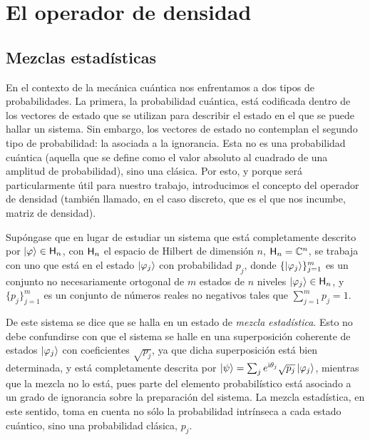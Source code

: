 \section{El operador de densidad}
\label{sec:ch2_density_operator}

\subsection{Mezclas estadísticas}


En el contexto de la mecánica cuántica nos enfrentamos a dos tipos de probabilidades. La primera, la probabilidad cuántica, está codificada dentro de los vectores de estado que se utilizan para describir el estado en el que se puede hallar un sistema. Sin embargo, los vectores de estado no contemplan el segundo tipo de probabilidad: la asociada a la ignorancia. Esta no es una probabilidad cuántica (aquella que se define como el valor absoluto al cuadrado de una amplitud de probabilidad), sino una clásica. Por esto, y porque será particularmente útil para nuestro trabajo, introducimos el concepto del operador de densidad (también llamado, en el caso discreto, que es el que nos incumbe, matriz de densidad).


Supóngase que en lugar de estudiar un sistema que está completamente descrito por $\ket{\varphi}\in{\sf H}_{n}$, con ${\sf H}_{n}$ el espacio de Hilbert de dimensión $n$, \ie{} ${\sf H}_{n}=\mathbb{C}^{n}$, se trabaja con uno que está en el estado $\ket{\varphi_{j}}$ con probabilidad $p_{j}$, donde $\{\ket{\varphi_{j}}\}_{j=1}^{m}$ es un conjunto no necesariamente ortogonal de $m$ estados de $n$ niveles $\ket{\varphi_{j}}\in{\sf H}_{n}$, y $\{p_{j}\}_{j=1}^{m}$ es un conjunto de números reales no negativos tales que $\sum_{j=1}^{m} p_{j}=1$.

De este sistema se dice que se halla en un estado de \textit{mezcla estadística}. Esto no debe confundirse con que el sistema se halle en una superposición coherente de estados $\ket{\varphi_{j}}$ con coeficientes $\sqrt{p_{j}}$, ya que dicha superposición está bien determinada, y está completamente descrita por $\ket{\psi}=\sum_{j} e^{\text{i} \theta_j} \sqrt{p_{j}}\ket{\varphi_{j}}$, mientras que la mezcla no lo está, pues parte del elemento probabilístico está asociado a un grado de ignorancia sobre la preparación del sistema. La mezcla estadística, en este sentido, toma en cuenta no sólo la probabilidad intrínseca a cada estado cuántico, sino una probabilidad clásica, $p_{j}$. 

